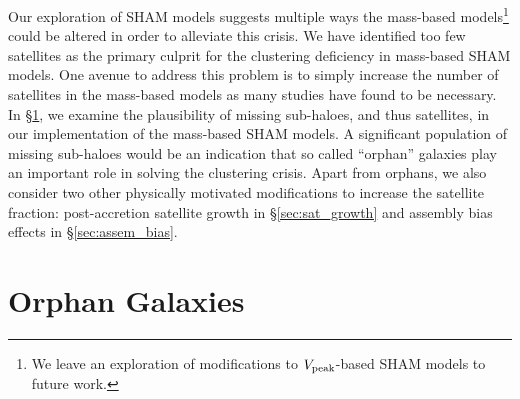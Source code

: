 \documentclass[useAMS,fleqn,usenatbib]{mnras}
\begin{document}
Our exploration of SHAM models suggests multiple ways the mass-based models\footnote{We leave an exploration of modifications to $V_{\rm peak}$-based SHAM models to future work.} could be altered in order to alleviate this crisis. We have identified too few satellites as the primary culprit for the clustering deficiency in mass-based SHAM models.  One avenue to address this problem is to simply increase the number of satellites in the mass-based models as many studies have found to be necessary.  In \S \ref{sec:orphans}, we examine the plausibility of missing sub-haloes, and thus satellites, in our implementation of the mass-based SHAM models.  A significant population of missing sub-haloes would be an indication that so called ``orphan'' galaxies play an important role in solving the clustering crisis.  Apart from orphans, we also consider two other physically motivated modifications to increase the satellite fraction: post-accretion satellite growth in \S \ref{sec:sat_growth} and assembly bias effects in \S \ref{sec:assem_bias}.   

\section{Orphan Galaxies}
\label{sec:orphans}
\end{document}
